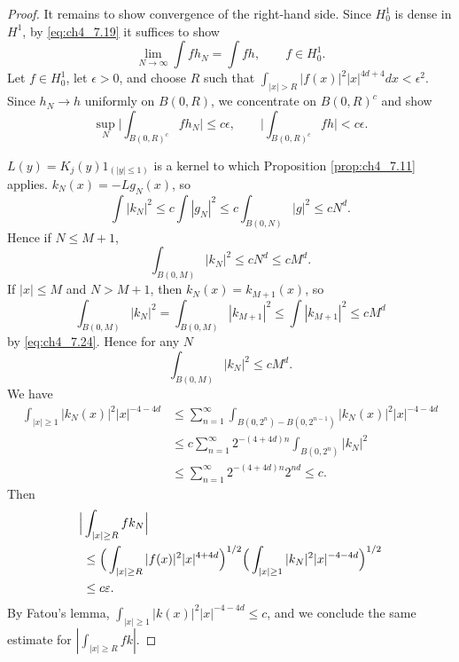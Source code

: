 \begin{proof}
It remains to show convergence of the right-hand side. Since $H_0^1$ is dense in $H^1$, by \eqref{eq:ch4_7.19} it suffices to show
\mpagebreak
\begin{equation}\label{eq:ch4_7.22}
    \lim_{N\to\infty} \int fh_N = \int fh, \qquad f \in H_0^1.
\end{equation}
Let $f \in H_0^1$, let $\epsilon > 0$, and choose $R$ such that $\int_{|x|>R} |f(x)|^2|x|^{4d+4}dx < \epsilon^2$. Since $h_N \to h$ uniformly on $B(0,R)$, we concentrate on $B(0,R)^c$ and show
\begin{equation}\label{eq:ch4_7.23}
    \sup_N\Big|\int_{B(0,R)^c} fh_N\Big| \leq c\epsilon, \qquad \Big|\int_{B(0,R)^c} fh\Big| < c\epsilon.
\end{equation}

$L(y) = K_j(y)1_{(|y|\leq 1)}$ is a kernel to which Proposition \ref{prop:ch4_7.11} applies. $k_N(x) = -Lg_N(x)$, so
\begin{equation}\label{eq:ch4_7.24}
    \int |k_N|^2 \leq c\int |g_N|^2 \leq c\int_{B(0,N)} |g|^2 \leq cN^d.
\end{equation}
Hence if $N \leq M + 1$,
\begin{equation}\label{eq:ch4_7.25}
    \int_{B(0,M)} |k_N|^2 \leq cN^d \leq cM^d.
\end{equation}
If $|x| \leq M$ and $N > M + 1$, then $k_N(x) = k_{M+1}(x)$, so
\begin{equation}\label{eq:ch4_7.26}
    \int_{B(0,M)} |k_N|^2 = \int_{B(0,M)} |k_{M+1}|^2 \leq \int |k_{M+1}|^2 \leq cM^d
\end{equation}
by \eqref{eq:ch4_7.24}. Hence for any $N$
\[
    \int_{B(0,M)} |k_N|^2 \leq cM^d.
\]
We have
\begin{align*}
    \int_{|x|\geq 1} |k_N(x)|^2|x|^{-4-4d} &\leq \sum_{n=1}^\infty \int_{B(0,2^n)-B(0,2^{n-1})} |k_N(x)|^2|x|^{-4-4d} \\
    &\leq c\sum_{n=1}^\infty 2^{-(4+4d)n}\int_{B(0,2^n)} |k_N|^2 \\
    &\leq \sum_{n=1}^\infty 2^{-(4+4d)n}2^{nd} \leq c.
\end{align*}
Then
\begin{align}\label{eq:ch4_7.27}
    \Big|&\int_{|x|\geq R} fk_N\Big| \\
    &\leq \Big(\int_{|x|\geq R} |f(x)|^2|x|^{4+4d}\Big)^{1/2}\Big(\int_{|x|\geq 1} |k_N|^2|x|^{-4-4d}\Big)^{1/2} \notag \\
    &\leq c\epsilon. \notag
\end{align}
\mnewpage
By Fatou's lemma, $\int_{|x|\geq 1} |k(x)|^2|x|^{-4-4d} \leq c$, and we conclude the same estimate for $|\int_{|x|\geq R}fk|$.


\end{proof}
